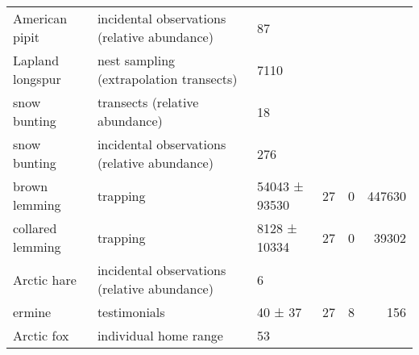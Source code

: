 \begin{table}[ht]
\begin{tabularx}{\textwidth}{lllrrr}
  American pipit & incidental observations (relative abundance) & 87 &  &  &  \\ 
  Lapland longspur & nest sampling (extrapolation transects) & 7110 &  &  &  \\ 
  snow bunting & transects (relative abundance) & 18 &  &  &  \\ 
  snow bunting & incidental observations (relative abundance) & 276 &  &  &  \\ 
  brown lemming & trapping & 54043 ± 93530 &  27 &   0 & 447630 \\ 
  collared lemming & trapping & 8128 ± 10334 &  27 &   0 & 39302 \\ 
  Arctic hare & incidental observations (relative abundance) & 6 &  &  &  \\ 
  ermine & testimonials & 40 ± 37 &  27 &   8 & 156 \\ 
  Arctic fox & individual home range & 53 &  &  &  \\ 
   \hline
\end{tabularx}
\endgroup
\end{table}

